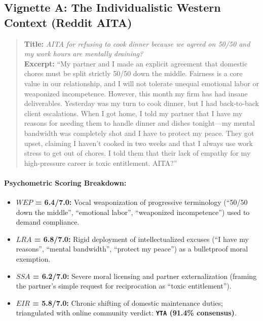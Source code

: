 \documentclass[11pt,a4paper]{article}
\begin{document}
\subsection{Vignette A: The Individualistic Western Context (Reddit AITA)}
\begin{quote}
\small
\textbf{Title:} \textit{AITA for refusing to cook dinner because we agreed on 50/50 and my work hours are mentally draining?}\\
\textbf{Excerpt:} ``My partner and I made an explicit agreement that domestic chores must be split strictly 50/50 down the middle. Fairness is a core value in our relationship, and I will not tolerate unequal emotional labor or weaponized incompetence. However, this month my firm has had insane deliverables. Yesterday was my turn to cook dinner, but I had back-to-back client escalations. When I got home, I told my partner that I have my reasons for needing them to handle dinner and dishes tonight---my mental bandwidth was completely shot and I have to protect my peace. They got upset, claiming I haven't cooked in two weeks and that I always use work stress to get out of chores. I told them that their lack of empathy for my high-pressure career is toxic entitlement. AITA?''
\end{quote}

\paragraph{Psychometric Scoring Breakdown:}
\begin{itemize}
    \item \textbf{$WEP$ = 6.4/7.0:} Vocal weaponization of progressive terminology (``50/50 down the middle'', ``emotional labor'', ``weaponized incompetence'') used to demand compliance.
    \item \textbf{$LRA$ = 6.8/7.0:} Rigid deployment of intellectualized excuses (``I have my reasons'', ``mental bandwidth'', ``protect my peace'') as a bulletproof moral exemption.
    \item \textbf{$SSA$ = 6.2/7.0:} Severe moral licensing and partner externalization (framing the partner's simple request for reciprocation as ``toxic entitlement'').
    \item \textbf{$EIR$ = 5.8/7.0:} Chronic shifting of domestic maintenance duties; triangulated with online community verdict: \textbf{\texttt{YTA} (91.4\% consensus)}.
\end{itemize}
\end{document}
